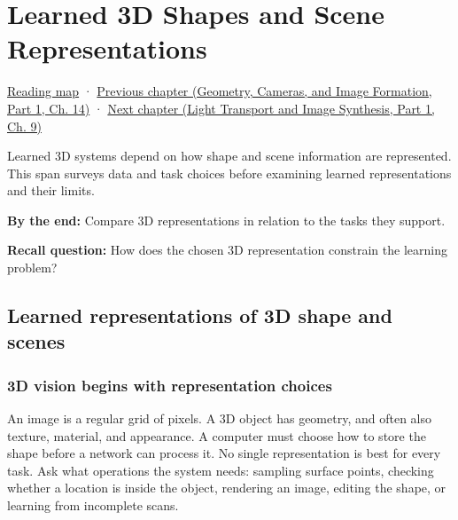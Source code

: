 \chapter{Learned 3D Shapes and Scene Representations}\label{04-visual-computing-ii-ch034-learned-3d-shapes-and-scene-representations}\hypertarget{04-visual-computing-ii-ch034}{}\label{stagechapter:04-visual-computing-ii-ch034}

\hypertarget{04-visual-computing-ii-ch034-learned-3d-shapes-and-scene-representations}{}

\hyperref[volume-reading-map]{Reading map} · \href{../03-Geometry-Cameras-and-Image-Formation-P01/main.pdf\#nameddest=04-visual-computing-ii-ch033-projection-scale-and-incidence-geometry}{Previous chapter (Geometry, Cameras, and Image Formation, Part 1, Ch. 14)} · \href{../04-Light-Transport-and-Image-Synthesis-P01/main.pdf\#nameddest=04-visual-computing-ii-ch035-a-complete-renderer-as-an-executable-forward-model}{Next chapter (Light Transport and Image Synthesis, Part 1, Ch. 9)}

Learned 3D systems depend on how shape and scene information are represented. This span surveys data and task choices before examining learned representations and their limits.

\textbf{By the end:} Compare 3D representations in relation to the tasks they support.

\textbf{Recall question:} How does the chosen 3D representation constrain the learning problem?

\section{Learned representations of 3D shape and scenes}\label{04-visual-computing-ii-ch034-learned-representations-of-3d-shape-and-scenes}

\hypertarget{04-visual-computing-ii-ch034-learned-representations-of-3d-shape-and-scenes}{}

\subsection{3D vision begins with representation choices}\label{04-visual-computing-ii-ch034-d-vision-begins-with-representation-choices}

\hypertarget{04-visual-computing-ii-ch034-d-vision-begins-with-representation-choices}{}

An image is a regular grid of pixels. A 3D object has geometry, and often also texture, material, and appearance. A computer must choose how to store the shape before a network can process it. No single representation is best for every task. Ask what operations the system needs: sampling surface points, checking whether a location is inside the object, rendering an image, editing the shape, or learning from incomplete scans.


